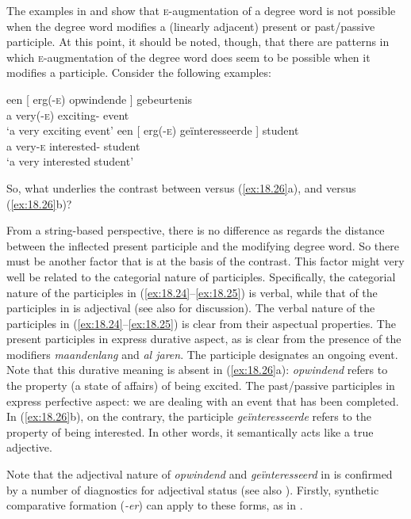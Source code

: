 \documentclass[output=paper]{langsci/langscibook}
\begin{document}
The examples in  and  show that
\textsc{e}-augmentation of a degree word is not possible when the degree word
modifies a (linearly adjacent) present or past/passive participle. At this
point, it should be noted, though, that there are patterns in which
\textsc{e}-augmentation of the degree word does seem to be possible when it
modifies a participle. Consider the following examples:

\ea%
    \label{ex:18.26}
	\ea
	\gll een [ erg(\textsc{-e})    opwindende ]    gebeurtenis\\
        a {} very(-\textsc{e})    exciting-\Agr{} {} event\\
	\glt \enquote*{a very exciting event}
	\ex
	\gll een [ erg(-\textsc{e})  geïnteresseerde ]    student\\
        a {}   very-\textsc{e}      interested-\Agr{} {}     student\\
	\glt \enquote*{a very interested student}
	\z
\z

So, what underlies the contrast between  versus
(\ref{ex:18.26}a), and  versus (\ref{ex:18.26}b)?

From a string-based perspective, there is no difference as regards the distance
between the inflected present participle and the modifying degree
word. So there must be another factor that is at the basis of
the contrast. This factor might very well be related to the categorial nature
of participles.  Specifically, the categorial nature of the participles in
(\ref{ex:18.24}--\ref{ex:18.25}) is verbal, while that of the
participles in  is adjectival (see also
\citealt{Broekhuis2013} for discussion). The verbal nature of the participles
in (\ref{ex:18.24}--\ref{ex:18.25}) is clear from their aspectual
properties.  The present participles in  express durative
aspect, as is clear from the presence of the modifiers \emph{maandenlang} and
\emph{al jaren}. The participle designates an ongoing event. Note that this
durative meaning is absent in (\ref{ex:18.26}a): \emph{opwindend} refers to
the property (a state of affairs) of being excited. The past/passive
participles in  express perfective aspect: we are dealing
with an event that has been completed. In (\ref{ex:18.26}b), on the
contrary, the participle \emph{geïnteresseerde} refers to the property of being
interested. In other words, it semantically acts like a true adjective.

Note that the adjectival nature of \emph{opwindend} and \emph{geïnteresseerd}
in  is confirmed by a number of diagnostics for adjectival
status (see also \citealt{Broekhuis2013}). Firstly, synthetic comparative
formation (\emph{-er}) can apply to these forms, as in .
\end{document}

